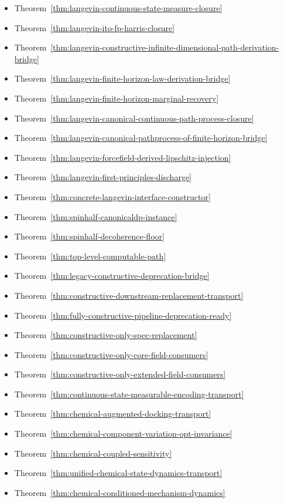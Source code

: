 \begin{itemize}
\item Theorem~\ref{thm:langevin-continuous-state-measure-closure}
\item Theorem~\ref{thm:langevin-ito-fp-harris-closure}
\item Theorem~\ref{thm:langevin-constructive-infinite-dimensional-path-derivation-bridge}
\item Theorem~\ref{thm:langevin-finite-horizon-law-derivation-bridge}
\item Theorem~\ref{thm:langevin-finite-horizon-marginal-recovery}
\item Theorem~\ref{thm:langevin-canonical-continuous-path-process-closure}
\item Theorem~\ref{thm:langevin-canonical-pathprocess-of-finite-horizon-bridge}
\item Theorem~\ref{thm:langevin-forcefield-derived-lipschitz-injection}
\item Theorem~\ref{thm:langevin-first-principles-discharge}
\item Theorem~\ref{thm:concrete-langevin-interface-constructor}
\item Theorem~\ref{thm:spinhalf-canonicaldp-instance}
\item Theorem~\ref{thm:spinhalf-decoherence-floor}
\item Theorem~\ref{thm:top-level-computable-path}
\item Theorem~\ref{thm:legacy-constructive-deprecation-bridge}
\item Theorem~\ref{thm:constructive-downstream-replacement-transport}
\item Theorem~\ref{thm:fully-constructive-pipeline-deprecation-ready}
\item Theorem~\ref{thm:constructive-only-spec-replacement}
\item Theorem~\ref{thm:constructive-only-core-field-consumers}
\item Theorem~\ref{thm:constructive-only-extended-field-consumers}
\item Theorem~\ref{thm:continuous-state-measurable-encoding-transport}
\item Theorem~\ref{thm:chemical-augmented-docking-transport}
\item Theorem~\ref{thm:chemical-component-variation-opt-invariance}
\item Theorem~\ref{thm:chemical-coupled-sensitivity}
\item Theorem~\ref{thm:unified-chemical-state-dynamics-transport}
\item Theorem~\ref{thm:chemical-conditioned-mechanism-dynamics}

\end{itemize}
